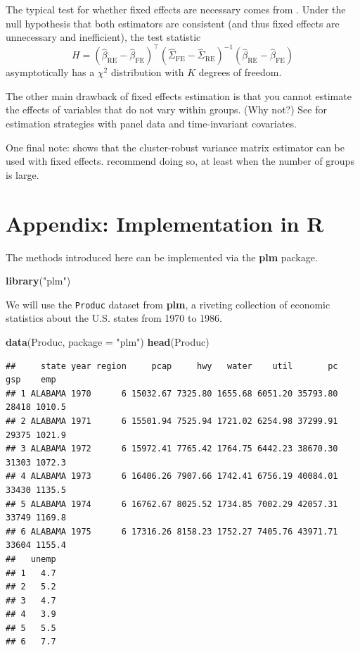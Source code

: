 \documentclass[12pt,oneside,openany]{book}
\newenvironment{Shaded}{\begin{snugshade}}{\end{snugshade}}
\newcommand{\KeywordTok}[1]{\textcolor[rgb]{0.13,0.29,0.53}{\textbf{#1}}}
\newcommand{\DataTypeTok}[1]{\textcolor[rgb]{0.13,0.29,0.53}{#1}}
\newcommand{\StringTok}[1]{\textcolor[rgb]{0.31,0.60,0.02}{#1}}
\newcommand{\NormalTok}[1]{#1}
\begin{document}
The typical test for whether fixed effects are necessary comes from
\citet{Hausman:1978bi}. Under the null hypothesis that both estimators
are consistent (and thus fixed effects are unnecessary and inefficient),
the test statistic \[
H = (\hat{\beta}_{\text{RE}} - \hat{\beta}_{\text{FE}})^\top (\hat{\Sigma}_{\text{FE}} - \hat{\Sigma}_{\text{RE}})^{-1} (\hat{\beta}_{\text{RE}} - \hat{\beta}_{\text{FE}})
\] asymptotically has a \(\chi^2\) distribution with \(K\) degrees of
freedom.

The other main drawback of fixed effects estimation is that you cannot
estimate the effects of variables that do not vary within groups. (Why
not?) See \citet[section 13.5]{greene} for estimation strategies with
panel data and time-invariant covariates.

One final note: \citet{Arellano:1987jx} shows that the cluster-robust
variance matrix estimator can be used with fixed effects.
\citet{Cameron:2015ud} recommend doing so, at least when the number of
groups is large.

\section{Appendix: Implementation in
R}\label{appendix-implementation-in-r-1}

The methods introduced here can be implemented via the \textbf{plm}
package.

\begin{Shaded}
\begin{Highlighting}[]
\KeywordTok{library}\NormalTok{(}\StringTok{"plm"}\NormalTok{)}
\end{Highlighting}
\end{Shaded}

We will use the \texttt{Produc} dataset from \textbf{plm}, a riveting
collection of economic statistics about the U.S. states from 1970 to
1986.

\begin{Shaded}
\begin{Highlighting}[]
\KeywordTok{data}\NormalTok{(Produc, }\DataTypeTok{package =} \StringTok{"plm"}\NormalTok{)}
\KeywordTok{head}\NormalTok{(Produc)}
\end{Highlighting}
\end{Shaded}

\begin{verbatim}
##     state year region     pcap     hwy   water    util       pc   gsp    emp
## 1 ALABAMA 1970      6 15032.67 7325.80 1655.68 6051.20 35793.80 28418 1010.5
## 2 ALABAMA 1971      6 15501.94 7525.94 1721.02 6254.98 37299.91 29375 1021.9
## 3 ALABAMA 1972      6 15972.41 7765.42 1764.75 6442.23 38670.30 31303 1072.3
## 4 ALABAMA 1973      6 16406.26 7907.66 1742.41 6756.19 40084.01 33430 1135.5
## 5 ALABAMA 1974      6 16762.67 8025.52 1734.85 7002.29 42057.31 33749 1169.8
## 6 ALABAMA 1975      6 17316.26 8158.23 1752.27 7405.76 43971.71 33604 1155.4
##   unemp
## 1   4.7
## 2   5.2
## 3   4.7
## 4   3.9
## 5   5.5
## 6   7.7
\end{verbatim}
\end{document}
